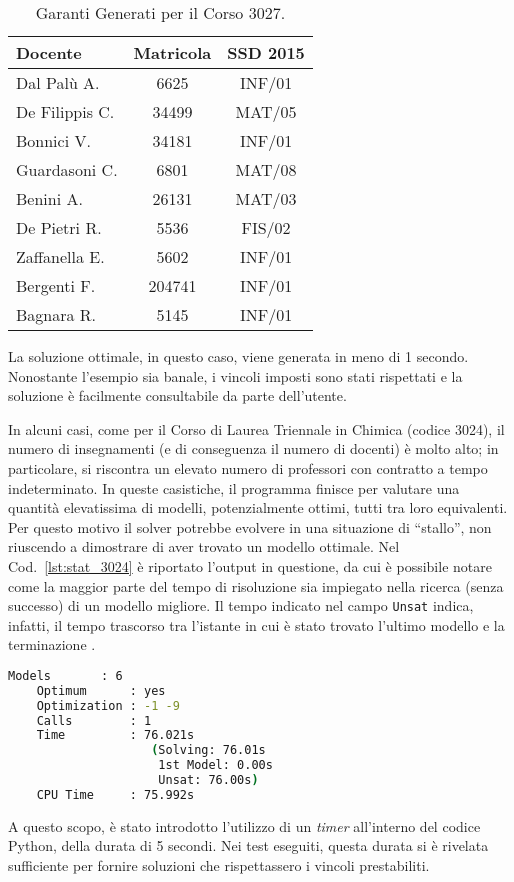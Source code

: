\begin{table}[!ht]
    \caption{Garanti Generati per il Corso 3027.}
    \centering
    \begin{tabular}{l c c}
        \toprule
        \textbf{Docente} & \textbf{Matricola} & \textbf{SSD 2015} \\
        \midrule
        Dal Palù A. & 6625 & INF/01 \\
        De Filippis C. & 34499 & MAT/05 \\
        Bonnici V. & 34181 & INF/01 \\
        Guardasoni C. & 6801 & MAT/08 \\
        Benini A. & 26131 & MAT/03 \\
        De Pietri R. & 5536 & FIS/02 \\
        Zaffanella E. & 5602 & INF/01 \\
        Bergenti F. & 204741 & INF/01 \\
        Bagnara R. & 5145 & INF/01 \\
        \bottomrule
    \end{tabular}
    \label{tab:garanti}
\end{table}

La soluzione ottimale, in questo caso, viene generata in meno di 1 secondo. 
Nonostante l'esempio sia banale, i vincoli imposti sono stati rispettati 
e la soluzione è facilmente consultabile da parte dell'utente.

In alcuni casi, come per il Corso di Laurea Triennale in Chimica (codice 3024), 
il numero di insegnamenti (e di conseguenza il numero di docenti) è molto 
alto; in particolare, si riscontra un elevato numero di professori con contratto
a tempo indeterminato. In queste casistiche, il programma finisce per valutare una quantità elevatissima 
di modelli, potenzialmente ottimi, tutti tra loro equivalenti. Per questo 
motivo il solver potrebbe evolvere in una situazione di ``stallo'', non 
riuscendo a dimostrare di aver trovato un modello ottimale. Nel Cod.~\ref{lst:stat_3024} è riportato l'output in questione, da cui è 
possibile notare come la maggior parte del tempo di risoluzione sia impiegato nella 
ricerca (senza successo) di un modello migliore. Il tempo indicato nel campo \texttt{Unsat} indica, infatti, il tempo trascorso tra 
l'istante in cui è stato trovato l'ultimo modello e la terminazione \cite{gebser2015potassco}.

\begin{lstlisting}[language=bash, captionpos=b, 
    caption={Statistiche clingo per il corso 3024}, 
    label={lst:stat_3024},
    backgroundcolor=\color{lightgray!20},
    basicstyle=\ttfamily\footnotesize]
    Models       : 6
    Optimum      : yes
    Optimization : -1 -9
    Calls        : 1
    Time         : 76.021s 
                    (Solving: 76.01s 
                     1st Model: 0.00s 
                     Unsat: 76.00s)
    CPU Time     : 75.992s
\end{lstlisting}

A questo scopo, è stato introdotto l'utilizzo di un \textit{timer} all'interno 
del codice Python, della durata di 5 secondi.
Nei test eseguiti, questa durata si è rivelata sufficiente per fornire soluzioni 
che rispettassero i vincoli prestabiliti.

